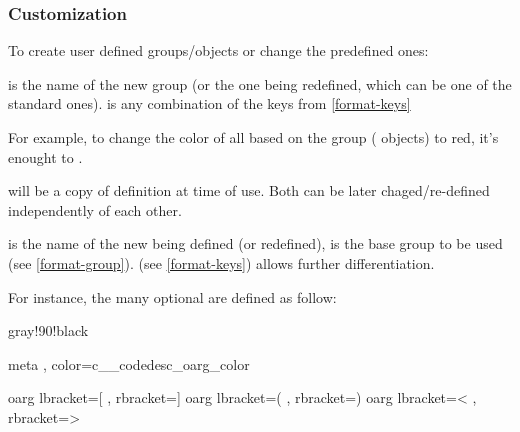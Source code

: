 \documentclass{article}
\begin{document}
  
  \newpage
\subsubsection{Customization}\label{format-custom}

To create  user defined groups/objects or change the predefined ones:


\begin{codedescribe}[code,new=2023/05/16]{}
\begin{codesyntax} %
\end{codesyntax}
 is the name of the new group (or the one being redefined, which can be one of the standard ones).  is any combination of the keys from \ref{format-keys}
\end{codedescribe}

For example, to change the color of all  based on the  group ( objects) to red, it's enought to  .

\begin{codedescribe}[code,new=2025/12/11]{\dupgroupfmt}
\begin{codesyntax} %
\end{codesyntax}
 will be a copy of  definition at time of use. Both can be later chaged/re-defined independently of each other.
\end{codedescribe}


\begin{codedescribe}[code,new=2023/05/16]{}
\begin{codesyntax} %
\end{codesyntax}
 is the name of the new  being defined (or redefined),
 is the base group to be used (see \ref{format-group}).  (see \ref{format-keys}) allows further differentiation.
\end{codedescribe}
For instance, the many optional  are defined as follow:
\begin{codestore}
 { gray!90!black }

 { meta , color=c__codedesc_oarg_color }

 {oarg} { lbracket={[} , rbracket={]} }
 {oarg} { lbracket={(} , rbracket={)} }
 {oarg} { lbracket={<} , rbracket={>} }
\end{codestore}
\end{document}
